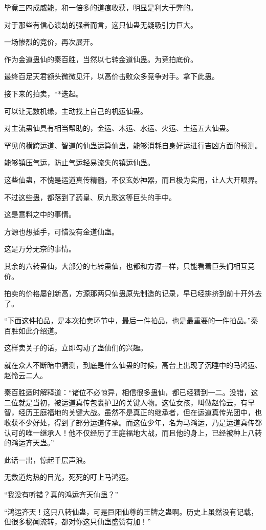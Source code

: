 \begin{this_body}
毕竟三四成威能，和一倍多的道痕收获，明显是利大于弊的。

对于那些有信心渡劫的强者而言，这只仙蛊无疑吸引力巨大。

一场惨烈的竞价，再次展开。

作为金道蛊仙的秦百胜，当然以七转金道仙蛊。为竞拍底价。

最终百足天君额头微微见汗，以高价击败众多竞争对手。拿下此蛊。

接下来的拍卖，**迭起。

可以让无数机缘，主动找上自己的机运仙蛊。

对主流蛊仙具有相当帮助的，金运、木运、水运、火运、土运五大仙蛊。

罕见的横跨运道、智道的仙蛊运算仙蛊，能够消耗自身好运进行吉凶方面的预测。

能够镇压气运，防止气运轻易流失的镇运仙蛊。

这些仙蛊，不愧是运道真传精髓，不仅玄妙神器，而且极为实用，让人大开眼界。

不过这些蛊，都落到了药皇、凤九歌这等巨头的手中。

这是意料之中的事情。

方源也想插手，可惜没有金道仙蛊。

这是万分无奈的事情。

其余的六转蛊仙，大部分的七转蛊仙，也都和方源一样，只能看着巨头们相互竞价。

拍卖的价格屡创新高，方源那两只仙蛊原先制造的记录，早已经排挤到前十开外去了。

“下面这件拍品，是本次拍卖环节中，最后一件拍品，也是最重要的一件拍品。”秦百胜如此介绍道。

这样卖关子的话，立即勾动了蛊仙们的兴趣。

就在众人不断暗中猜测，到底是什么仙蛊的时候，高台上出现了沉睡中的马鸿运、赵怜云二人。

秦百胜适时解释道：“诸位不必惊异，相信很多蛊仙，都已经猜到一二。没错，这二位就是当初，被运道真传包裹护卫的关键人物。这位女孩，叫做赵怜云，有早智，经历王庭福地的关键大战。虽然不是真正的继承者，但在运道真传光团中，也收获不少好处，得到了部分运道传承。而这位少年，名为马鸿运，乃是运道真传都认可的唯一继承人！他不仅经历了王庭福地大战，而且他的身上，已经被种上八转的鸿运齐天蛊。”

此话一出，惊起千层声浪。

无数道灼热的目光，死死的盯上马鸿运。

“我没有听错？真的鸿运齐天仙蛊？”

“鸿运齐天！这只八转仙蛊，可是巨阳仙尊的王牌之蛊啊。历史上虽然没有记载，但很多秘闻流转，都对你这只仙蛊盛赞有加！”


\end{this_body}
